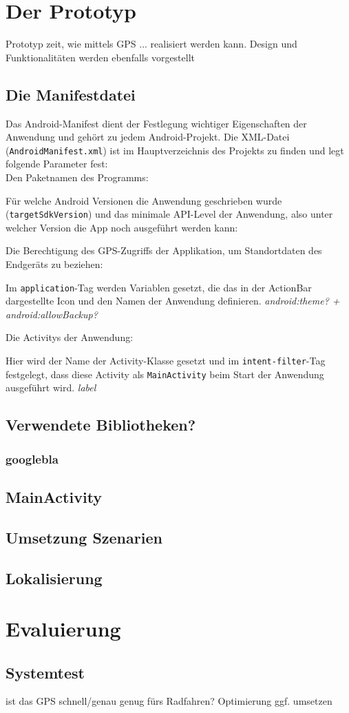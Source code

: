 \chapter{\label{chap:implementierung}Der Prototyp}
Prototyp zeit, wie mittels GPS ... realisiert werden kann.
Design und Funktionalitäten werden ebenfalls vorgestellt
\section{Die Manifestdatei}
Das Android-Manifest dient der Festlegung wichtiger Eigenschaften der Anwendung und gehört zu jedem Android-Projekt. Die \gls{XML}-Datei (\texttt{AndroidManifest.xml}) ist im Hauptverzeichnis des Projekts zu finden und legt folgende Parameter fest: \\
Den Paketnamen des Programms:

Für welche Android Versionen die Anwendung geschrieben wurde (\texttt{targetSdkVersion}) und das minimale \gls{API}-Level der Anwendung, also unter welcher Version die App noch ausgeführt werden kann:

Die Berechtigung des \gls{GPS}-Zugriffs der Applikation, um Standortdaten des Endgeräts zu beziehen:

Im \texttt{application}-Tag werden Variablen gesetzt, die das in der ActionBar dargestellte Icon und den Namen der Anwendung definieren. \textit{android:theme? + android:allowBackup?}

Die \glspl{Activity} der Anwendung:

Hier wird der Name der \gls{Activity}-Klasse gesetzt und im \texttt{intent-filter}-Tag festgelegt, dass diese \gls{Activity} als \texttt{MainActivity} beim Start der Anwendung ausgeführt wird. \textit{label}
\section{Verwendete Bibliotheken?}
\subsection{googlebla}
\section{MainActivity}
\section{Umsetzung Szenarien}
\section{Lokalisierung}
%
%
\chapter{Evaluierung}
\section{Systemtest}
ist das GPS schnell/genau genug fürs Radfahren?
Optimierung ggf. umsetzen
